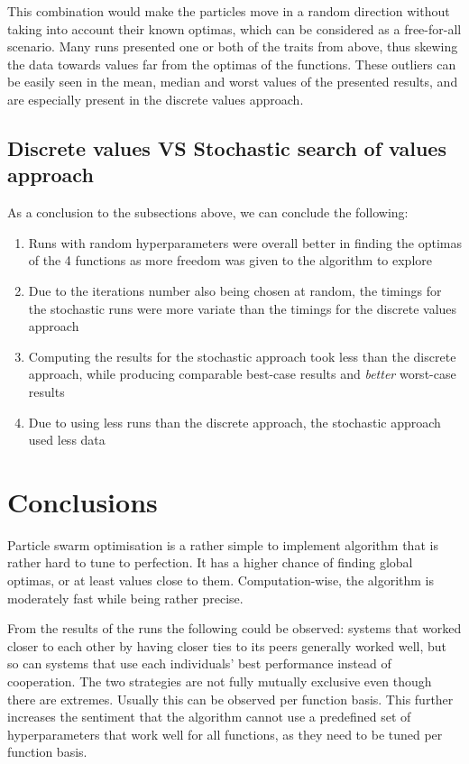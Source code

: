\documentclass[conference]{IEEEtran}
\begin{document}
This combination would make the particles move in a random direction without taking into account their known optimas, which
can be considered as a free-for-all scenario. Many runs presented one or both of the traits from above, thus skewing the
data towards values far from the optimas of the functions. These outliers can be easily seen in the mean, median and worst values
of the presented results, and are especially present in the discrete values approach.

\subsection{Discrete values VS Stochastic search of values approach}
As a conclusion to the subsections above, we can conclude the following:

\begin{enumerate}
    \item Runs with random hyperparameters were overall better in finding the optimas of the 4 functions as more freedom
    was given to the algorithm to explore
    \item Due to the iterations number also being chosen at random, the timings for the stochastic runs were more variate
    than the timings for the discrete values approach
    \item Computing the results for the stochastic approach took less than the discrete approach, while producing comparable
    best-case results and \textit{better} worst-case results
    \item Due to using less runs than the discrete approach, the stochastic approach used less data
\end{enumerate}

\section{Conclusions}
Particle swarm optimisation is a rather simple to implement algorithm that is rather hard to tune to perfection. It has a higher
chance of finding global optimas, or at least values close to them. Computation-wise, the algorithm is moderately fast
while being rather precise.

From the results of the runs the following could be observed: systems that worked closer to each other by having closer ties to
its peers generally worked well, but so can systems that use each individuals' best performance instead of cooperation. The two
strategies are not fully mutually exclusive even though there are extremes. Usually this can be observed per function basis.
This further increases the sentiment that the algorithm cannot use a predefined set of hyperparameters that work well for all
functions, as they need to be tuned per function basis.
\end{document}
